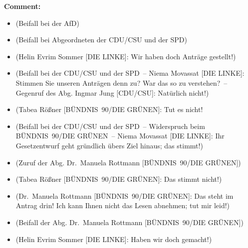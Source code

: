 \documentclass{article}
\begin{document}
\noindent\textbf{Comment:}
\begin{itemize}
    \setlength\itemsep{-3pt}
    \item (Beifall bei der AfD)
    \setlength\itemsep{-3pt}
    \item (Beifall bei Abgeordneten der CDU/CSU und der SPD)
    \setlength\itemsep{-3pt}
    \item (Helin Evrim Sommer [DIE LINKE]: Wir haben doch Anträge gestellt!)
    \setlength\itemsep{-3pt}
    \item (Beifall bei der CDU/CSU und der SPD – Niema Movassat [DIE LINKE]: Stimmen Sie unseren Anträgen denn zu? War das so zu verstehen? – Gegenruf des Abg. Ingmar Jung [CDU/CSU]: Natürlich nicht!)
    \setlength\itemsep{-3pt}
    \item (Tabea Rößner [BÜNDNIS 90/DIE GRÜNEN]: Tut es nicht!
    \setlength\itemsep{-3pt}
    \item (Beifall bei der CDU/CSU und der SPD – Widerspruch beim BÜNDNIS 90/DIE GRÜNEN – Niema Movassat [DIE LINKE]: Ihr Gesetzentwurf geht gründlich übers Ziel hinaus; das stimmt!)
    \setlength\itemsep{-3pt}
    \item (Zuruf der Abg. Dr. Manuela Rottmann [BÜNDNIS 90/DIE GRÜNEN])
    \setlength\itemsep{-3pt}
    \item (Tabea Rößner [BÜNDNIS 90/DIE GRÜNEN]: Das stimmt nicht!)
    \setlength\itemsep{-3pt}
    \item (Dr. Manuela Rottmann [BÜNDNIS 90/DIE GRÜNEN]: Das steht im Antrag drin! Ich kann Ihnen nicht das Lesen abnehmen; tut mir leid!)
    \setlength\itemsep{-3pt}
    \item (Beifall der Abg. Dr. Manuela Rottmann [BÜNDNIS 90/DIE GRÜNEN])
    \setlength\itemsep{-3pt}
    \item (Helin Evrim Sommer [DIE LINKE]: Haben wir doch gemacht!)
\end{itemize}
\end{document}
